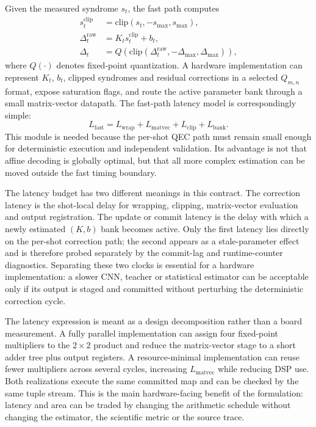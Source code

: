 \documentclass[11pt]{article}
\begin{document}
Given the measured syndrome \(s_t\), the fast path computes
\begin{align}
    s_t^{\mathrm{clip}} &= \mathrm{clip}(s_t,-s_{\max},s_{\max}),\\
    \Delta_t^{\mathrm{raw}} &= K_t s_t^{\mathrm{clip}} + b_t,\\
    \Delta_t &= Q\!\left(
    \mathrm{clip}(\Delta_t^{\mathrm{raw}},-\Delta_{\max},\Delta_{\max})
    \right),
\end{align}
where \(Q(\cdot)\) denotes fixed-point quantization.  A hardware
implementation can represent \(K_t\), \(b_t\), clipped syndromes and residual
corrections in a selected \(Q_{m,n}\) format, expose saturation flags, and
route the active parameter bank through a small matrix-vector datapath.  The
fast-path latency model is correspondingly simple:
\begin{equation}
    L_{\mathrm{fast}} =
    L_{\mathrm{wrap}}+L_{\mathrm{matvec}}+L_{\mathrm{clip}}+L_{\mathrm{bank}} .
\end{equation}
This module is needed because the per-shot QEC path must remain small enough
for deterministic execution and independent validation.  Its advantage is not
that affine decoding is globally optimal, but that all more complex estimation
can be moved outside the fast timing boundary.

The latency budget has two different meanings in this contract.  The
correction latency is the shot-local delay for wrapping, clipping, matrix-vector
evaluation and output registration.  The update or commit latency is the delay
with which a newly estimated \((K,b)\) bank becomes active.  Only the first
latency lies directly on the per-shot correction path; the second appears as a
stale-parameter effect and is therefore probed separately by the commit-lag and
runtime-counter diagnostics.  Separating these two clocks is essential for a
hardware implementation: a slower CNN, teacher or statistical estimator can be
acceptable only if its output is staged and committed without perturbing the
deterministic correction cycle.

The latency expression is meant as a design decomposition rather than a board
measurement.  A fully parallel implementation can assign four fixed-point
multipliers to the \(2\times2\) product and reduce the matrix-vector stage to a
short adder tree plus output registers.  A resource-minimal implementation can
reuse fewer multipliers across several cycles, increasing
\(L_{\mathrm{matvec}}\) while reducing DSP use.  Both realizations execute the
same committed map and can be checked by the same tuple stream.  This is the
main hardware-facing benefit of the formulation: latency and area can be traded
by changing the arithmetic schedule without changing the estimator, the
scientific metric or the source trace.
\end{document}

